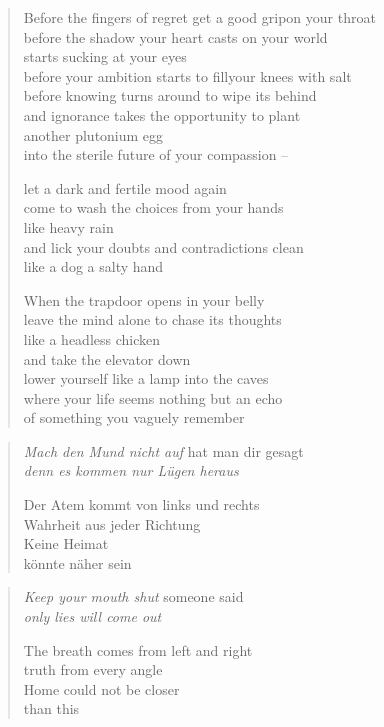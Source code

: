 \begin{verse}

Before the fingers of regret get a good grip\verselinebreak on your throat\\
before the shadow your heart casts on your world\\
starts sucking at your eyes\\
before your ambition starts to fill\verselinebreak your knees with salt\\
before knowing turns around to wipe its behind\\
and ignorance takes the opportunity to plant\\
another plutonium egg\\
into the sterile future of your compassion --

let a dark and fertile mood again\\
come to wash the choices from your hands\\
like heavy rain\\
and lick your doubts and contradictions clean\\
like a dog a salty hand

When the trapdoor opens in your belly\\
leave the mind alone to chase its thoughts\\
like a headless chicken\\
and take the elevator down\\
lower yourself like a lamp into the caves\\
where your life seems nothing but an echo\\
of something you vaguely remember

\end{verse}

\clearpage

\begin{verse}

\emph{Mach den Mund nicht auf} hat man dir gesagt\\
\emph{denn es kommen nur Lügen heraus}

Der Atem kommt von links und rechts\\
Wahrheit aus jeder Richtung\\
Keine Heimat\\
könnte näher sein

\end{verse}

\clearpage

\begin{verse}
\emph{Keep your mouth shut} someone said\\
\emph{only lies will come out}

The breath comes from left and right\\
truth from every angle\\
Home could not be closer\\
than this

\end{verse}
